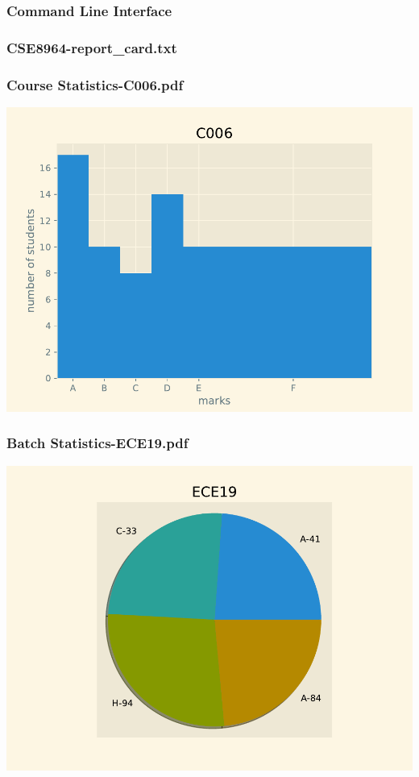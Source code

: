 \subsubsection*{Command Line Interface}
\subsubsection*{CSE8964-report\_card.txt}
\fontsize{12pt}{\baselineskip}\selectfont
{}
 \fontsize{14pt}{\baselineskip}\selectfont
\subsubsection*{Course Statistics-C006.pdf}
\includegraphics{outputs/Course Statistics-C006.pdf}
\subsubsection*{Batch Statistics-ECE19.pdf}
\includegraphics{outputs/Batch Statistics-ECE19.pdf}
